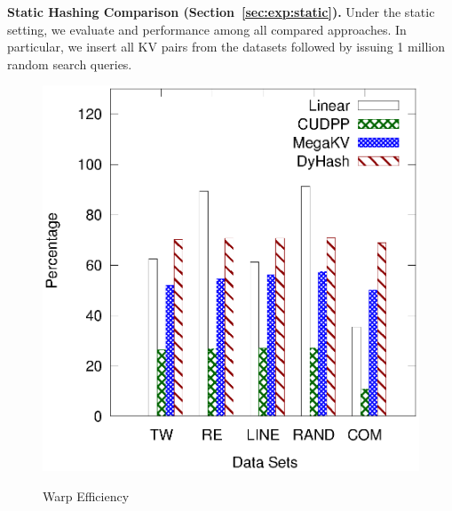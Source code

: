\vspace{1mm}\noindent\textbf{Static Hashing Comparison (Section~\ref{sec:exp:static}).}
Under the static setting, we evaluate  and  performance among all compared approaches. 
In particular, we insert all KV pairs from the datasets followed by issuing 1 million random search queries. 



\begin{figure}[ht]
	\begin{minipage}{0.3\linewidth}\centering
		\includegraphics[width=\linewidth]{pic/static-profi/warp.eps}
		\centerline{Warp Efficiency}
	\end{minipage}
	\hfill
	\begin{minipage}{0.3\linewidth}\centering

\end{minipage}
\end{figure}
